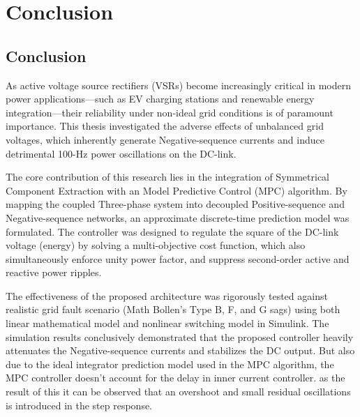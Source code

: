 \chapter{Conclusion}\label{ch:Conclusion}
\section{Conclusion}
As active voltage source rectifiers (VSRs) become increasingly critical in modern power applications—such
as EV charging stations and renewable energy integration—their reliability under non-ideal grid conditions
is of paramount importance. This thesis investigated the adverse effects of unbalanced grid voltages, which
inherently generate Negative-sequence currents and induce detrimental 100-Hz power oscillations on the DC-link.\par
The core contribution of this research lies in the integration of Symmetrical Component Extraction with an
Model Predictive Control (MPC) algorithm. By mapping the coupled Three-phase system into decoupled
Positive-sequence and Negative-sequence networks, an approximate discrete-time prediction model was formulated.
The controller was designed to regulate the square of the DC-link voltage (energy) by solving a multi-objective
cost function, which also simultaneously enforce unity power factor, and suppress second-order active and
reactive power ripples.\par
The effectiveness of the proposed architecture was rigorously tested against realistic grid fault scenario
(Math Bollen's Type B, F, and G sags) using both linear mathematical model and nonlinear switching model in
Simulink. The simulation results conclusively demonstrated that the proposed controller heavily attenuates
the Negative-sequence currents and stabilizes the DC output. But also due to the ideal integrator prediction
model used in the MPC algorithm, the MPC controller doesn't account for the delay in inner current controller.
as the result of this it can be observed that an overshoot and small residual oscillations is introduced in
the step response.\par
